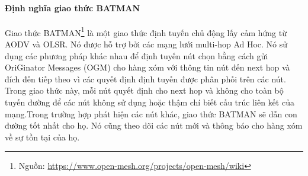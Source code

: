\documentclass[11pt,openany]{book}
\begin{document}
\paragraph{Định nghĩa giao thức BATMAN}
Giao thức BATMAN\footnote{Nguồn: \url{https://www.open-mesh.org/projects/open-mesh/wiki}} là một giao thức định tuyến chủ động lấy cảm hứng từ AODV và OLSR. Nó được hỗ trợ bởi các mạng lưới multi-hop Ad Hoc. Nó sử dụng các phương pháp khác nhau để định tuyến nút chọn bằng cách gửi OriGinator Messages (OGM) cho hàng xóm với thông tin nút đến next hop và đích đến tiếp theo vì các quyết định định tuyến được phân phối trên các nút. Trong giao thức này, mỗi nút quyết định cho next hop và không cho toàn bộ tuyến đường để các nút không sử dụng hoặc thậm chí biết cấu trúc liên kết của mạng.Trong trường hợp phát hiện các nút khác, giao thức BATMAN sẽ dẫn con đường tốt nhất cho họ. Nó cũng theo dõi các nút mới và thông báo cho hàng xóm về sự tồn tại của họ.
\end{document}
